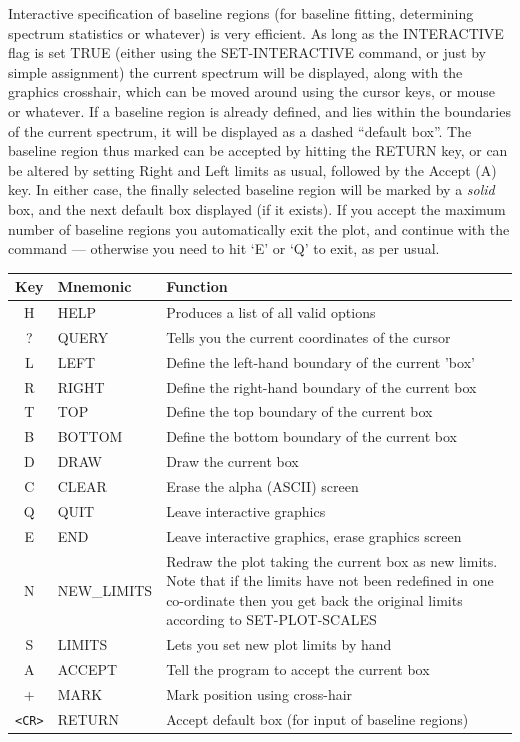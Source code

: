 \documentclass[11pt,twoside]{report}
\begin{document}
Interactive specification of baseline regions
(for baseline fitting, determining spectrum statistics or
whatever) is very efficient. As long as the INTERACTIVE
flag is set TRUE (either using the SET-INTERACTIVE command, or just by simple
assignment) the current spectrum will be displayed, along with the graphics
crosshair, which can be moved around using the cursor keys, or mouse or
whatever. If a baseline region is already defined, and lies within the
boundaries of the current spectrum, it will be displayed as a dashed ``default
box''. The baseline region thus marked can be accepted by hitting the RETURN
key, or can be altered by setting Right and Left limits as usual, followed by
the Accept (A) key. In either case, the finally selected baseline region will
be marked by a {\em solid} box, and the next default box 
 displayed (if it exists). If you accept the maximum number
of baseline regions you automatically exit the plot, and continue with the
command --- otherwise you need to hit `E' or `Q' to exit, as per usual.

\begin{table}[htbp]
\begin{center}
\begin{tabular}{|c|l|l|} \hline
Key	& Mnemonic	& Function \\ \hline
H	&HELP	&Produces a list of all valid options\\
?	&QUERY	&Tells you the current coordinates of the cursor\\
L	&LEFT	&Define the left-hand boundary of the current 'box'\\
R	&RIGHT	&Define the right-hand boundary of the current box\\
T	&TOP	&Define the top boundary of the current box\\
B	&BOTTOM	&Define the bottom boundary of the current box\\
D	&DRAW	&Draw the current box\\
C	&CLEAR	&Erase the alpha (ASCII) screen\\
Q	&QUIT	&Leave interactive graphics\\
E	&END	&Leave interactive graphics, erase graphics screen\\
N	&NEW\_LIMITS    &
    \parbox[t]{3.7in}{Redraw the plot taking the current box as new
            limits. Note that if the limits have not been
            redefined in one co-ordinate then you get back the
            original limits according to SET-PLOT-SCALES}\\
S	&LIMITS	&Lets you set new plot limits by hand\\
A	&ACCEPT	&Tell the program to accept the current box\\
+	&MARK	&Mark position using cross-hair\\
\verb+<CR>+ &RETURN &Accept default box (for input of baseline regions)\\ \hline
\end{tabular}
\end{center}
\end{table}
\end{document}
